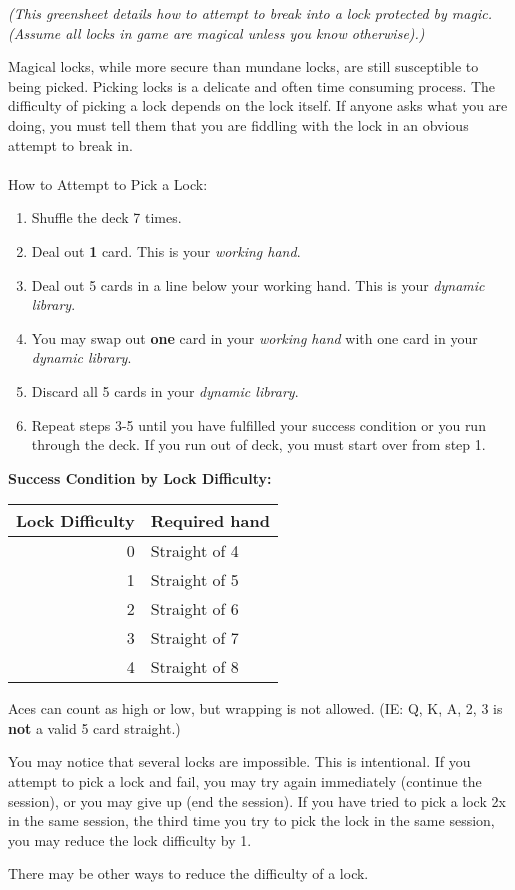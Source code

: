 \documentclass[green]{NeptuneBall}
\begin{document}
\name{\gDecking{}}

\emph{(This greensheet details how to attempt to break into a lock protected by magic. (Assume all locks in game are magical unless you know otherwise).)}

Magical locks, while more secure than mundane locks, are still susceptible to being picked. Picking locks is a delicate and often time consuming process. The difficulty of picking a lock depends on the lock itself. If anyone asks what you are doing, you must tell them that you are fiddling with the lock in an obvious attempt to break in.\\ \\

How to Attempt to Pick a Lock:
\begin{enumerate}
	\item Shuffle the deck 7 times.
	\item Deal out {\bf 1} card. This is your {\em working hand}.
	\item Deal out 5 cards in a line below your working hand. This is your {\em dynamic library}.
	\item You may swap out {\bf one} card in your {\em working hand} with one card in your {\em dynamic library}.
	\item Discard all 5 cards in your {\em dynamic library}.
	\item Repeat steps 3-5 until you have fulfilled your success condition or you run through the deck.  If you run out of deck, you must start over from step 1.
\end{enumerate}

{\bf Success Condition by Lock Difficulty:}\\
\begin{tabular}{||r|l||}
\hline\hline
Lock Difficulty	& Required hand\\
\hline
0	& Straight of 4\\
1	& Straight of 5\\
2	& Straight of 6\\
3	& Straight of 7\\
4	& Straight of 8\\
\hline\hline 
\end{tabular}

\vspace{10 mm}

Aces can count as high or low, but wrapping is not allowed. (IE: Q, K, A, 2, 3 is {\bf not} a valid 5 card straight.)

You may notice that several locks are impossible. This is intentional. If you attempt to pick a lock and fail, you may try again immediately (continue the session), or you may give up (end the session). If you have tried to pick a lock 2x in the same session, the third time you try to pick the lock in the same session, you may reduce the lock difficulty by 1.

There may be other ways to reduce the difficulty of a lock.
\end{document}
